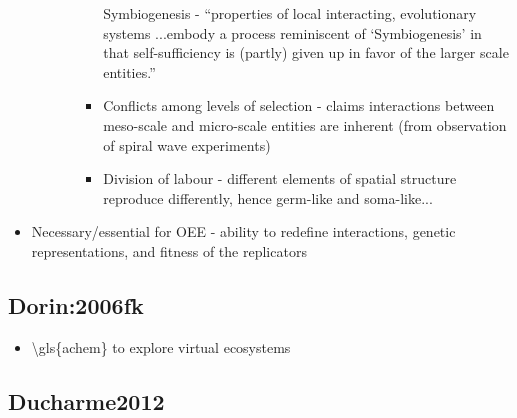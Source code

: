 \begin{itemize}
\begin{itemize}
\begin{itemize}
\begin{itemize}
						Symbiogenesis - ``properties of local interacting, evolutionary
						systems ...embody a process reminiscent of `Symbiogenesis' in
						that self-sufficiency is (partly) given up in favor of the
						larger scale entities.''
						
						\item
						
						Conflicts among levels of selection - claims interactions
						between meso-scale and micro-scale entities are inherent (from
						observation of spiral wave experiments)
						
						\item
						
						Division of labour - different elements of spatial structure
						reproduce differently, hence germ-like and soma-like...
						
					\end{itemize}
				\end{itemize}
			\end{itemize}
			\item
			
			Necessary/essential for OEE - ability to redefine interactions,
			genetic representations, and fitness of the replicators
			
		\end{itemize}
		
		\hypertarget{dorin2006fk}{\subsection{Dorin:2006fk}\label{dorin2006fk}}
		
		\begin{itemize}
			\item
			
			\textbackslash{}gls\{achem\} to explore virtual ecosystems
			
		\end{itemize}
		
		\hypertarget{ducharme2012}{\subsection{Ducharme2012}\label{ducharme2012}}
		
